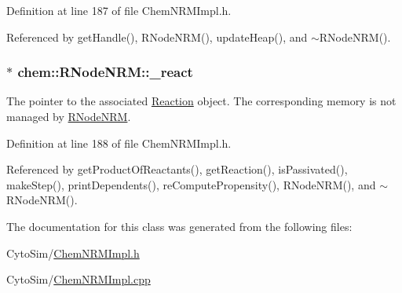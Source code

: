 Definition at line 187 of file Chem\-N\-R\-M\-Impl.\-h.



Referenced by get\-Handle(), R\-Node\-N\-R\-M(), update\-Heap(), and $\sim$\-R\-Node\-N\-R\-M().

\hypertarget{classchem_1_1RNodeNRM_add823fa4b223afe0d750ed731c827d07}{
\subsubsection[{\-\_\-react}]{$\ast$ {\bf chem\-::\-R\-Node\-N\-R\-M\-::\-\_\-react}}}\label{classchem_1_1RNodeNRM_add823fa4b223afe0d750ed731c827d07}


The pointer to the associated \hyperlink{classchem_1_1Reaction}{Reaction} object. The corresponding memory is not managed by \hyperlink{classchem_1_1RNodeNRM}{R\-Node\-N\-R\-M}. 



Definition at line 188 of file Chem\-N\-R\-M\-Impl.\-h.



Referenced by get\-Product\-Of\-Reactants(), get\-Reaction(), is\-Passivated(), make\-Step(), print\-Dependents(), re\-Compute\-Propensity(), R\-Node\-N\-R\-M(), and $\sim$\-R\-Node\-N\-R\-M().



The documentation for this class was generated from the following files\-:\begin{DoxyCompactItemize}
\item 
Cyto\-Sim/\hyperlink{ChemNRMImpl_8h}{Chem\-N\-R\-M\-Impl.\-h}\item 
Cyto\-Sim/\hyperlink{ChemNRMImpl_8cpp}{Chem\-N\-R\-M\-Impl.\-cpp}\end{DoxyCompactItemize}
